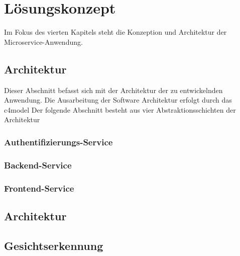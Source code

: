 \chapter{Lösungskonzept}
Im Fokus des vierten Kapitels steht die Konzeption und Architektur der Microservice-Anwendung.

\section{Architektur}
Dieser Abschnitt befasst sich mit der Architektur der zu entwickelnden Anwendung.
Die Ausarbeitung der Software Architektur erfolgt durch das c4model
Der folgende Abschnitt besteht aus vier Abstraktionsschichten der Architektur


\subsection{Authentifizierungs-Service}
\subsection{Backend-Service}
\subsection{Frontend-Service}
\section{Architektur}
\section{Gesichtserkennung}